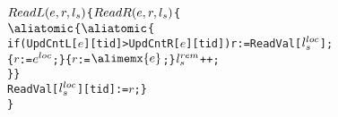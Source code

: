 \begin{figure*}
\begin{alltt}
\(ReadL(e,r,l\sb{s})\) \{                                    \(ReadR(e,r,l\sb{s})\) \{          
 \(\aliatomic\) \{                                    \(\aliatomic\) \{
  if (UpdCntL[\(e\)][tid]>UpdCntR[\(e\)][tid])       r := ReadVal[\(l\sp{loc}\sb{s}\)];
   \{\(r\) := \(e\sp{loc}\);\} \{\(r\) := \(\alimemx{e}\);\}                      \(l\sp{rem}\sb{s}\)++;
 \}                                                \}
 ReadVal[\(l\sp{loc}\sb{s}\)][tid] := \(r\);               \}
\}\end{alltt}
\end{figure*}
